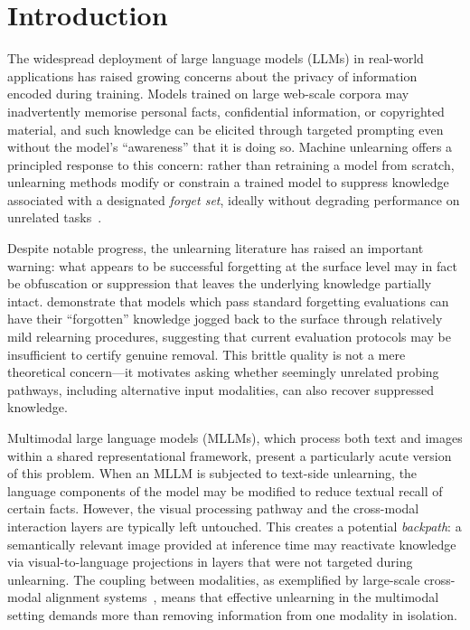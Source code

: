 \documentclass[12pt, a4paper]{article}
\begin{document}
\section{Introduction}
\label{sec:introduction}

The widespread deployment of large language models (LLMs) in real-world applications
has raised growing concerns about the privacy of information encoded during training.
Models trained on large web-scale corpora may inadvertently memorise personal facts,
confidential information, or copyrighted material, and such knowledge can be elicited
through targeted prompting even without the model's ``awareness'' that it is doing so.
Machine unlearning offers a principled response to this concern: rather than
retraining a model from scratch, unlearning methods modify or constrain a trained model
to suppress knowledge associated with a designated \emph{forget set}, ideally without
degrading performance on unrelated tasks~\citep{llmunlearning2024}.

Despite notable progress, the unlearning literature has raised an important warning: what
appears to be successful forgetting at the surface level may in fact be obfuscation or
suppression that leaves the underlying knowledge partially intact.
\citet{relearning2024} demonstrate that models which pass standard forgetting evaluations
can have their ``forgotten'' knowledge jogged back to the surface through relatively
mild relearning procedures, suggesting that current evaluation protocols may be
insufficient to certify genuine removal.
This brittle quality is not a mere theoretical concern---it motivates asking whether
seemingly unrelated probing pathways, including alternative input modalities, can
also recover suppressed knowledge.

Multimodal large language models (MLLMs), which process both text and images within a
shared representational framework, present a particularly acute version of this
problem.
When an MLLM is subjected to text-side unlearning, the language components of the model
may be modified to reduce textual recall of certain facts.
However, the visual processing pathway and the cross-modal interaction layers are
typically left untouched.
This creates a potential \emph{backpath}: a semantically relevant image provided at
inference time may reactivate knowledge via visual-to-language projections in layers
that were not targeted during unlearning.
The coupling between modalities, as exemplified by large-scale cross-modal alignment
systems~\citep{imagebind2023}, means that effective unlearning in the multimodal setting
demands more than removing information from one modality in isolation.
\end{document}
